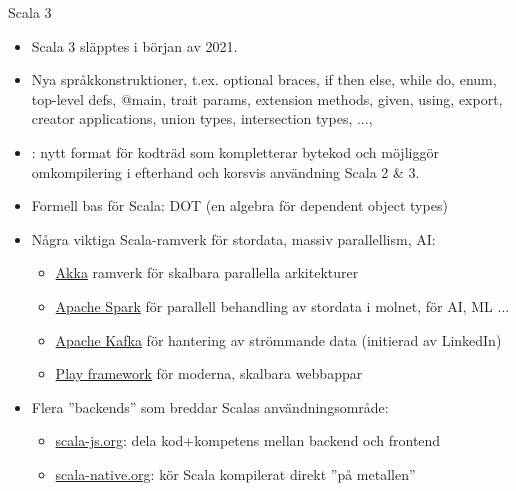\begin{Slide}{Scala 3}\SlideFontSmall
\begin{itemize}
  \item Scala 3 släpptes i början av 2021.
  \item Nya språkkonstruktioner, t.ex.  optional braces, if then else, while do, enum, top-level defs, @main, trait params, extension methods, given, using, export, creator applications, union types, intersection types,  ...,
  \item {}: nytt format för kodträd som kompletterar bytekod och möjliggör omkompilering i efterhand och korsvis användning Scala 2 \& 3. \\
  \item Formell bas för Scala: DOT (en algebra för dependent object types)
\item Några viktiga Scala-ramverk för stordata, massiv parallellism, AI:
\begin{itemize}\SlideFontTiny
  \item \href{https://akka.io/}{Akka} ramverk för skalbara parallella arkitekturer
  \item \href{https://spark.apache.org/}{Apache Spark} för parallell behandling av stordata i molnet, för AI, ML ...
  \item \href{https://en.wikipedia.org/wiki/Apache_Kafka}{Apache Kafka} för hantering av strömmande data (initierad av LinkedIn)
  \item \href{https://www.playframework.com/}{Play framework} för moderna, skalbara webbappar
\end{itemize}
\item Flera ''backends'' som breddar Scalas användningsområde:
\begin{itemize}\SlideFontTiny
  \item \href{http://www.scala-js.org/}{scala-js.org}: dela kod+kompetens mellan backend och frontend
  \item \href{http://scala-native.org}{scala-native.org}: kör Scala kompilerat direkt ''på metallen''
\end{itemize}
\end{itemize}
\end{Slide}


